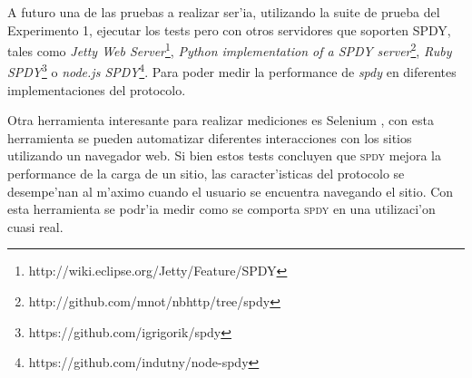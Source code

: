 \documentclass[a4paper,11pt,twocolumn]{article}
\begin{document}
A futuro una de las pruebas a realizar ser'ia, utilizando la suite de prueba del Experimento 1, ejecutar los tests pero con otros servidores que soporten SPDY, tales como \emph{Jetty Web Server}\footnote{http://wiki.eclipse.org/Jetty/Feature/SPDY}, \emph{Python implementation of a SPDY server}\footnote{http://github.com/mnot/nbhttp/tree/spdy}, \emph{Ruby SPDY}\footnote{https://github.com/igrigorik/spdy} o \emph{node.js SPDY}\footnote{https://github.com/indutny/node-spdy}. Para poder medir la performance de \emph{spdy} en diferentes implementaciones del protocolo.

Otra herramienta interesante para realizar mediciones es Selenium \cite{selenium}, con esta herramienta se pueden automatizar diferentes interacciones con los sitios utilizando un navegador web. Si bien estos tests concluyen que \textsc{spdy} mejora la performance de la carga de un sitio, las caracter'isticas del protocolo se desempe'nan al m'aximo cuando el usuario se encuentra navegando el sitio. Con esta herramienta se podr'ia medir como se comporta \textsc{spdy} en una utilizaci'on cuasi real.

\nocite{*}

\end{document}
